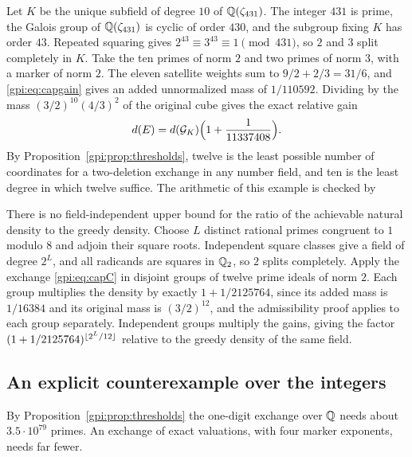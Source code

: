 \begin{example}\label{gpi:ex:431}
Let $K$ be the unique subfield of degree $10$ of $\mathbb{Q}(\zeta_{431})$. The integer $431$ is
prime, the Galois group of $\mathbb{Q}(\zeta_{431})$ is cyclic of order $430$, and the subgroup fixing
$K$ has order $43$. Repeated squaring gives $2^{43}\equiv3^{43}\equiv1\pmod{431}$, so $2$ and
$3$ split completely in $K$. Take the ten primes of norm $2$ and two primes of norm $3$, with a
marker of norm $2$. The eleven satellite weights sum to $9/2+2/3=31/6$, and
\eqref{gpi:eq:capgain} gives an added unnormalized mass of $1/110592$. Dividing by the mass
$(3/2)^{10}(4/3)^2$ of the original cube gives the exact relative gain
\[
 d(E)=d(\mathcal G_K)\Bigl(1+\frac1{11337408}\Bigr).
\]
By Proposition~\ref{gpi:prop:thresholds}, twelve is the least possible number of coordinates for a
two-deletion exchange in any number field, and ten is the least degree in which twelve
suffice. The arithmetic of this example is checked by
\end{example}

\begin{example}\label{gpi:ex:unbounded}
There is no field-independent upper bound for the ratio of the achievable natural density to
the greedy density. Choose $L$ distinct rational primes congruent to $1$ modulo $8$ and
adjoin their square roots. Independent square classes give a field of degree $2^L$, and all
radicands are squares in $\mathbb{Q}_2$, so $2$ splits completely. Apply the exchange
\eqref{gpi:eq:capC} in disjoint groups of twelve prime ideals of norm $2$. Each group
multiplies the density by exactly $1+1/2125764$, since its added mass is $1/16384$ and its
original mass is $(3/2)^{12}$, and the admissibility proof applies to each group separately.
Independent groups multiply the gains, giving the factor
$(1+1/2125764)^{\lfloor2^L/12\rfloor}$ relative to the greedy density of the same field.
\end{example}

\subsection{An explicit counterexample over the integers}\label{gpi:sec:explicit}
{\raggedright{}}

By Proposition~\ref{gpi:prop:thresholds} the one-digit exchange over $\mathbb{Q}$ needs about $3.5\cdot10^{79}$
primes. An exchange of exact valuations, with four marker exponents, needs far fewer.

